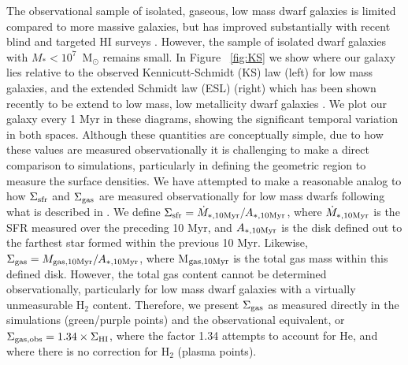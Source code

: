 \documentclass[twocolumn]{aastex61}
\begin{document}
The observational sample of isolated, gaseous, low mass dwarf galaxies is limited compared to more massive galaxies, but has improved substantially with recent blind and targeted HI surveys \citep[e.g.][]{Giovanelli2005, Geha2006, Geha2012, Walter2008, Cannon2011, Haynes2011, Hunter2012, Bradford2015, Tollerud2015, Sand2015}. However, the sample of isolated dwarf galaxies with $M_{*} < 10^{7}$~M$_{\odot}$ remains small. In Figure ~\ref{fig:KS} we show where our galaxy lies relative to the observed Kennicutt-Schmidt (KS) law (left) for low mass galaxies, and the extended Schmidt law (ESL) (right) which has been shown recently to be extend to low mass, low metallicity dwarf galaxies \citep{Roychowdhury2017}. We plot our galaxy every 1 Myr in these diagrams, showing the significant temporal variation in both spaces. Although these quantities are conceptually simple, due to how these values are measured observationally it is challenging to make a direct comparison to simulations, particularly in defining the geometric region to measure the surface densities. We have attempted to make a reasonable analog to how $\Sigma_{\rm sfr}$ and $\Sigma_{\rm gas}$ are measured observationally for low mass dwarfs following what is described in \citet{Roychowdhury2014}. We define $\Sigma_{\rm sfr} = \dot{M}_{*, \rm{10 Myr}} / A_{*, \rm{10 Myr}}$, where $\dot{M}_{*, \rm{10 Myr}}$ is the SFR measured over the preceding 10 Myr, and $A_{*, \rm{10 Myr}}$ is the disk defined out to the farthest star formed within the previous 10 Myr. Likewise, $\Sigma_{\rm gas} = M_{\rm gas, 10 Myr} / A_{*, \rm{10 Myr}}$, where M$_{\rm gas, 10 Myr}$ is the total gas mass within this defined disk. However, the total gas content cannot be determined observationally, particularly for low mass dwarf galaxies with a virtually unmeasurable H$_2$ content. Therefore, we present $\Sigma_{\rm gas}$ as measured directly in the simulations (green/purple points) and the observational equivalent, or $\Sigma_{\rm gas, obs} = 1.34 \times \Sigma_{\rm HI}$, where the factor 1.34 attempts to account for He, and where there is no correction for H$_2$ (plasma points). 
\end{document}
